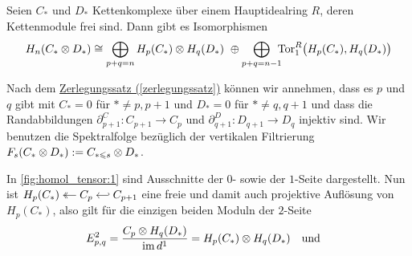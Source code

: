 \begin{satz}[label=satz:homol_tensor,{name=[{Homologie des Tensorproduktes von Kettenkomplexen}]}]
	Seien $C_*$ und $D_*$ Kettenkomplexe über einem Hauptidealring $R$, deren Kettenmodule frei sind.
	Dann gibt es Isomorphismen
	\[
		H_n \enbrace*{C_* \otimes D_*} \cong \smashoperator[r]{\bigoplus_{p+q=n}}\enspace H_p(C_*) \otimes H_q(D_*) \,\,\oplus \smashoperator[r]{\bigoplus_{p+q=n-1}}\enspace \Tor_1^R \enbrace[\big]{H_p(C_*),H_q(D_*)}
	\]
\end{satz}
\begin{beweis}
	Nach dem \hyperref[zerlegungssatz]{Zerlegungssatz (\ref*{zerlegungssatz})} können wir annehmen, dass es $p$ und $q$ gibt mit $C_*=0$ für $*\neq p,p+1$ und $D_*=0$ für $* \neq q,q+1$ und dass die Randabbildungen $\partial^C_{p+1} \colon C_{p+1} \to C_p$ und $\partial^D_{q+1} \colon D_{q+1} \to D_q$ injektiv sind.
	Wir benutzen die Spektralfolge bezüglich der vertikalen Filtrierung $F_s \enbrace*{C_* \otimes D_*} := C_{*\le s} \otimes D_*$.
	\begin{figure}[hbt]
	\end{figure}
	In \cref{fig:homol_tensor:1} sind Ausschnitte der $0$- sowie der $1$-Seite dargestellt.
	Nun ist $\begin{tikzcd}[cramped,sep=small] H_p(C_*) & C_p \lar[two heads] & C_{p+1} \lar[{Hooks[left]}-{Computer Modern Rightarrow}] \end{tikzcd}$ eine freie und damit auch projektive Auflösung von $H_p(C_*)$, also gilt für die einzigen beiden Moduln der $2$-Seite
	\begin{align}
		E^2_{p,q} &= \frac{C_p \otimes H_q(D_*)}{\im d^1} = H_p \enbrace*{C_*} \otimes H_q(D_*) \quad \text{und} \quad \\

\end{align}
\end{beweis}
